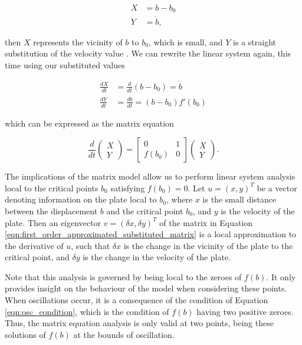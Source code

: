 \documentclass{article}
\begin{document}
\begin{align}
    X &= b - b_0 \\
    Y &= \dot{b},
\end{align}

then $X$ represents the vicinity of $b$ to $b_0$, which is small,
and $Y$ is a straight substitution of the velocity value .
We can rewrite the linear system again, this time using our substituted values

\begin{align}
    \frac{dX}{dt} &= \frac{d}{dt}\left(b-b_0\right) = \dot{b} \\
    \frac{dY}{dt} &= \frac{d\dot{b}}{dt} = (b-b_0)f'(b_0)
\end{align}

which can be expressed as the matrix equation

\begin{equation}
    \frac{d}{dt}\begin{pmatrix}
        X \\
        Y
    \end{pmatrix} = \begin{bmatrix}
        0 & 1 \\
        f(b_0) & 0
    \end{bmatrix} \begin{pmatrix}
        X \\
        Y
    \end{pmatrix}.
    \label{eqn:first_order_approximated_substituted_matrix}
\end{equation}


The implications of the matrix model allow us to perform linear system analysis local to the critical points $b_0$ satisfying $f(b_0) = 0.$
Let $u=(x,y)^T$ be a vector denoting information on the plate local to $b_0$,
where $x$ is the small distance between the displacement $b$ and the critical point $b_0$,
and $y$ is the velocity of the plate.
Then an eigenvector $v=(\delta x, \delta y)^T$ of the matrix in Equation \ref{eqn:first_order_approximated_substituted_matrix} is a local approximation to the derivative of $u$,
such that $\delta x$ is the change in the vicinity of the plate to the critical point,
and $\delta y$ is the change in the velocity of the plate.



Note that this analysis is governed by being local to the zeroes of $f(b)$.
It only provides insight on the behaviour of the model when considering these points.
When oscillations occur, it is a consequence of the condition of Equation \ref{eqn:osc_condition},
which is the condition of $f(b)$ having two positive zeroes.
Thus, the matrix equation analysis is only valid at two points,
being these solutions of $f(b)$ at the bounds of oscillation.
\end{document}
